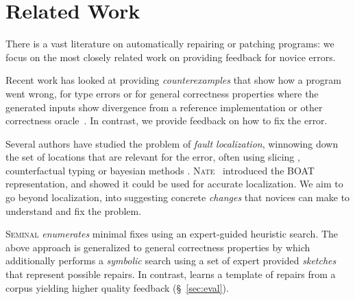 \section{Related Work}
\label{sec:related-work}

There is a vast literature on automatically repairing or patching programs:
we focus on the most closely related work on providing feedback for novice errors.

%
Recent work has looked at providing \emph{counterexamples} that show how a
program went wrong, for type errors \cite{Seidel2016-ul} or for general
correctness properties where the generated inputs show divergence from a
reference implementation or other correctness oracle~\cite{Song_2019}. In
contrast, we provide feedback on how to fix the error.

 Several authors have studied the problem of
\emph{fault localization}, \ie winnowing down the set of locations that are
relevant for the error, often using slicing
\citep{Wand1986-nw,Haack2003-vc,Tip2001-qp,Rahli2015-tt}, counterfactual typing
\citep{Chen2014-gd} or bayesian methods \citep{Zhang2014-lv}.
%
\textsc{Nate}~\citep{Seidel:2017} introduced the BOAT representation,
and showed it could be used for accurate localization.
%
We aim to go beyond localization, into suggesting concrete \emph{changes} that
novices can make to understand and fix the problem.

%
\textsc{Seminal} \citep{Lerner2007-dt} \emph{enumerates} minimal fixes using an
expert-guided heuristic search.
%
The above approach is generalized to general correctness properties by
\cite{singh2013} which additionally performs a \emph{symbolic} search using a
set of expert provided \emph{sketches} that represent possible repairs.
%
In contrast, \toolname learns a template of repairs from a corpus yielding
higher quality feedback (\S~\ref{sec:eval}).

